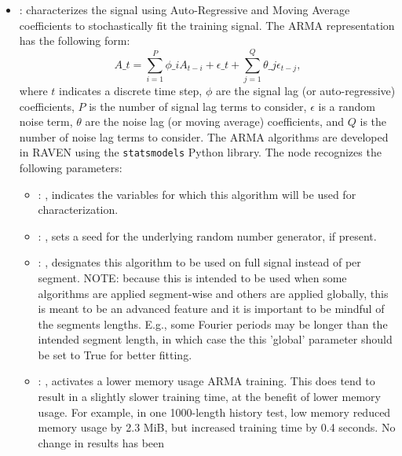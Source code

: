 \begin{itemize}
    \item {}:
      characterizes the signal using Auto-Regressive and Moving Average         coefficients to
      stochastically fit the training signal.         The ARMA representation has the following
      form:         \begin{equation*}           A\_t = \sum_{i=1}^P \phi\_i A_{t-i} + \epsilon\_t +
      \sum_{j=1}^Q \theta\_j \epsilon_{t-j},         \end{equation*}         where $t$ indicates a
      discrete time step, $\phi$ are the signal lag (or auto-regressive)         coefficients, $P$
      is the number of signal lag terms to consider, $\epsilon$ is a random noise         term,
      $\theta$ are the noise lag (or moving average) coefficients, and $Q$ is the number of
      noise lag terms to consider. The ARMA algorithms are developed in RAVEN using the
      \texttt{statsmodels} Python library.
      The  node recognizes the following parameters:
        \begin{itemize}
          \item {}: ,
            indicates the variables for which this algorithm will be used for characterization.
          \item {}: ,
            sets a seed for the underlying random number generator, if present.
          \item {}: ,
            designates this algorithm to be used on full signal instead of per
            segment. NOTE: because this is intended to be used when some algorithms are
            applied segment-wise and others are applied globally, this is meant to be an
            advanced feature and it is important to be mindful of the segments lengths.
            E.g., some Fourier periods may be longer than the intended segment length, in
            which case the this 'global' parameter should be set to True for better
            fitting. 
          \item {}: ,
            activates a lower memory usage ARMA training. This does tend to result
            in a slightly slower training time, at the benefit of lower memory usage. For
            example, in one 1000-length history test, low memory reduced memory usage by 2.3
            MiB, but increased training time by 0.4 seconds. No change in results has been

\end{itemize}
\end{itemize}
